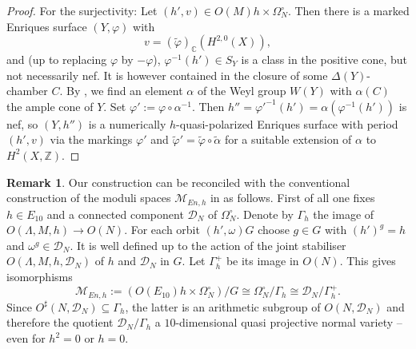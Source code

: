 \documentclass{amsart}
\theoremstyle{definition}
\newtheorem{remark}[definition]{Remark}
\theoremstyle{plain}
\newcommand{\CC}{\mathbb{C}}
\newcommand{\ZZ}{\mathbb{Z}}
\newcommand{\D}{\mathcal{D}}
\newcommand{\M}{\mathcal{M}}
\begin{document}
\begin{proof}
    For the surjectivity: Let $\left(h',v\right)\in O(M)h\times\Omega_N^\circ$. Then there is a marked Enriques surface $\left(Y,\varphi\right)$ with
    $$v=\left(\widetilde{\varphi}\right)_{\CC}\left(H^{2,0}(X)\right),$$
    and (up to replacing $\varphi$ by $-\varphi$),
    $\varphi^{-1}\left(h'\right)\in S_Y$ is a class in the positive cone, but not necessarily nef.
    It is however contained in the closure of some $\Delta(Y)$-chamber $C$. By , we find an element $\alpha$ of the Weyl group $W(Y)$ with $\alpha(C)$ the ample cone of $Y$. Set $\varphi' := \varphi \circ \alpha^{-1}$. Then $h''=\varphi'^{-1}(h')=\alpha\left(\varphi^{-1}\left(h'\right)\right)$ is nef, so $(Y,h'')$ is a numerically $h$-quasi-polarized Enriques surface with period $(h',v)$ via the markings $\varphi'$ and $\widetilde{\varphi}'=\widetilde{\varphi}\circ\widetilde{\alpha}$ for a suitable extension of $\alpha$ to $H^2(X,\ZZ)$.

\end{proof}

\begin{remark}
Our construction can be reconciled with the conventional construction of the moduli spaces $\M_{En,h}$ in \cite{gritsenko-hulek} as follows.
First of all one fixes $h \in E_{10}$ and a connected component $\D_N$ of $\Omega_N^\circ$.
Denote by $\Gamma_h$ the image of $O(\Lambda,M,h) \to O(N)$.
For each orbit $(h',\omega)G$ choose $g \in G$ with $(h')^g=h$ and $\omega^g \in \D_N$. It is well defined up to the action of the joint stabiliser $O(\Lambda, M, h, \D_N)$ of $h$ and $\D_N$ in $G$. Let $\Gamma_h^+$ be its image in $O(N)$. This gives isomorphisms
\begin{equation}
    \M_{En,h}:=(O(E_{10})h \times \Omega_N^\circ)/G \cong \Omega_N^\circ/\Gamma_h \cong  \D_N/\Gamma_h^+.
\end{equation}
Since $O^\sharp(N,\D_N) \subseteq \Gamma_h$, the latter is an arithmetic subgroup of $O(N,\D_N)$ and therefore the quotient
$\D_N/ \Gamma_h$ a $10$-dimensional quasi projective normal variety \cite{baily-borel} -- even for $h^2=0$ or $h=0$.  %
\end{remark}
\end{document}
